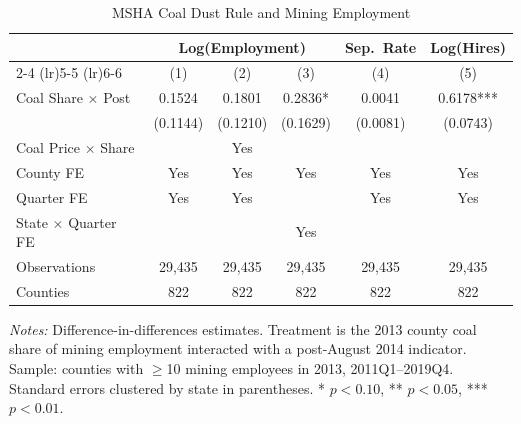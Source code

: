 \begin{table}[htbp]
\centering
\caption{MSHA Coal Dust Rule and Mining Employment}
\label{tab:main}
\begin{threeparttable}
\begin{tabular}{lccccc}
\toprule
 & \multicolumn{3}{c}{Log(Employment)} & Sep.\ Rate & Log(Hires) \\
\cmidrule(lr){2-4} \cmidrule(lr){5-5} \cmidrule(lr){6-6}
 & (1) & (2) & (3) & (4) & (5) \\
\midrule
Coal Share $\times$ Post & 0.1524 & 0.1801 & 0.2836* & 0.0041 & 0.6178*** \\
 & (0.1144) & (0.1210) & (0.1629) & (0.0081) & (0.0743) \\
\addlinespace
Coal Price $\times$ Share &  & Yes &  &  &  \\
County FE & Yes & Yes & Yes & Yes & Yes \\
Quarter FE & Yes & Yes &  & Yes & Yes \\
State $\times$ Quarter FE &  &  & Yes &  &  \\
Observations & 29,435 & 29,435 & 29,435 & 29,435 & 29,435 \\
Counties & 822 & 822 & 822 & 822 & 822 \\
\bottomrule
\end{tabular}
\begin{tablenotes}[flushleft]\small
\item \textit{Notes:} Difference-in-differences estimates. Treatment is the 2013 county coal share of mining employment interacted with a post-August 2014 indicator. Sample: counties with $\geq$10 mining employees in 2013, 2011Q1--2019Q4. Standard errors clustered by state in parentheses. * $p<0.10$, ** $p<0.05$, *** $p<0.01$.
\end{tablenotes}
\end{threeparttable}
\end{table}

